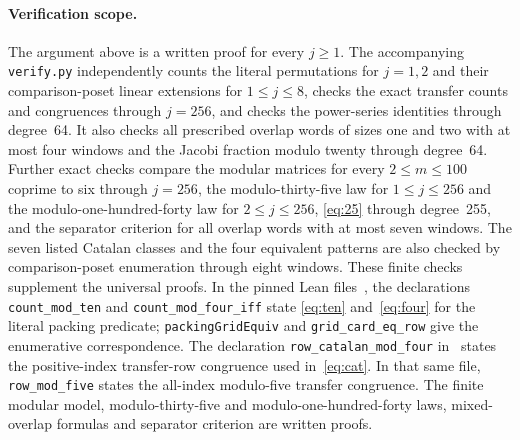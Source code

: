 \documentclass[11pt]{article}
\begin{document}
\paragraph{Verification scope.}
The argument above is a written proof for every $j\geq1$.
The accompanying \texttt{verify.py} independently counts the literal
permutations for $j=1,2$ and their comparison-poset linear extensions
for $1\leq j\leq8$, checks the exact transfer counts and congruences
through $j=256$, and checks the power-series identities through
degree~64. It also checks all prescribed overlap words of sizes one
and two with at most four windows and the Jacobi fraction modulo
twenty through degree~64. Further exact checks compare the modular
matrices for every $2\leq m\leq100$ coprime to six through $j=256$,
the modulo-thirty-five law for $1\leq j\leq256$ and the
modulo-one-hundred-forty law for $2\leq j\leq256$,
\eqref{eq:25} through degree~255, and the separator criterion
for all overlap words with at most seven windows.
The seven listed Catalan classes and the four equivalent patterns
are also checked by comparison-poset enumeration through eight windows.
These finite checks supplement the universal proofs.
In the pinned Lean files~\cite{Core,Transfer}, the declarations
\texttt{count\_mod\_ten} and \texttt{count\_mod\_four\_iff} state
\eqref{eq:ten} and~\eqref{eq:four} for the literal packing predicate;
\texttt{packingGridEquiv} and \texttt{grid\_card\_eq\_row} give the
enumerative correspondence. The declaration
\texttt{row\_catalan\_mod\_four} in~\cite{Transfer} states the
positive-index transfer-row congruence used in~\eqref{eq:cat}.
In that same file, \texttt{row\_mod\_five} states the all-index
modulo-five transfer congruence. The finite modular model,
modulo-thirty-five and modulo-one-hundred-forty laws, mixed-overlap
formulas and separator criterion are written proofs.
\end{document}
